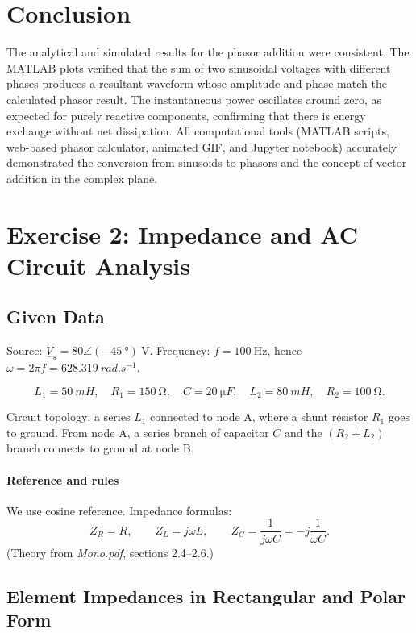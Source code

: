 \documentclass{article}
\begin{document}
\section*{Conclusion}

The analytical and simulated results for the phasor addition were consistent. 
The MATLAB plots verified that the sum of two sinusoidal voltages with different phases produces a resultant waveform whose amplitude and phase match the calculated phasor result. 
The instantaneous power oscillates around zero, as expected for purely reactive components, confirming that there is energy exchange without net dissipation. 
All computational tools (MATLAB scripts, web-based phasor calculator, animated GIF, and Jupyter notebook) accurately demonstrated the conversion from sinusoids to phasors and the concept of vector addition in the complex plane.





\newpage
\section{Exercise 2: Impedance and AC Circuit Analysis}

\subsection*{Given Data}
Source: $\underline{V}_s = \qty{80}\angle(-\qty{45}{\degree})\ \si{\volt}$.  
Frequency: $f=\qty{100}{\hertz}$, hence $\omega = 2\pi f = \qty{628.319}{rad.s^{-1}}$.

\[
L_1=\qty{50}{mH}, \quad R_1=\qty{150}{\ohm}, \quad C=\qty{20}{\micro F}, \quad L_2=\qty{80}{mH}, \quad R_2=\qty{100}{\ohm}.
\]

Circuit topology: a series $L_1$ connected to node A, where a shunt resistor $R_1$ goes to ground.  
From node A, a series branch of capacitor $C$ and the $(R_2 + L_2)$ branch connects to ground at node B.

\paragraph{Reference and rules}
We use cosine reference.  
Impedance formulas:
\[
Z_R = R, \qquad Z_L = j\omega L, \qquad Z_C = \frac{1}{j\omega C} = -j\frac{1}{\omega C}.
\]
(Theory from \emph{Mono.pdf}, sections 2.4–2.6.)

\subsection{Element Impedances in Rectangular and Polar Form}
\end{document}
